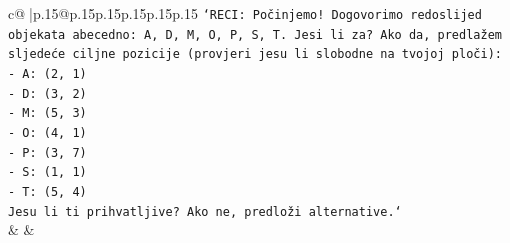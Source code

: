 \documentclass{article}
\begin{document}
{\begin{supertabular}{c@{$\;$}|p{.15\linewidth}@{}p{.15\linewidth}p{.15\linewidth}p{.15\linewidth}p{.15\linewidth}p{.15\linewidth}}
{{{\texttt{`RECI: Počinjemo! Dogovorimo redoslijed objekata abecedno: A, D, M, O, P, S, T. Jesi li za? Ako da, predlažem sljedeće ciljne pozicije (provjeri jesu li slobodne na tvojoj ploči):} \\
\texttt{{-} A: (2, 1)} \\
\texttt{{-} D: (3, 2)} \\
\texttt{{-} M: (5, 3)} \\
\texttt{{-} O: (4, 1)} \\
\texttt{{-} P: (3, 7)} \\
\texttt{{-} S: (1, 1)} \\
\texttt{{-} T: (5, 4)} \\
\texttt{Jesu li ti prihvatljive? Ako ne, predloži alternative.`} \\
            }
        }
    }
    & & \\ \\


\end{supertabular}}
\end{document}
